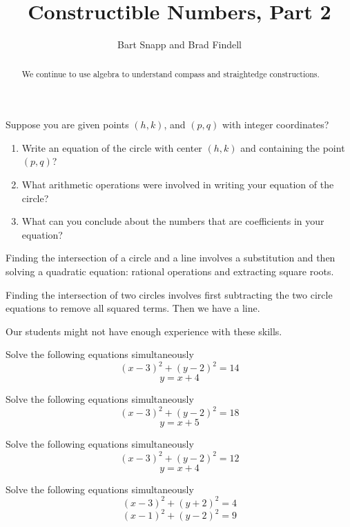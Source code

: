 \documentclass[nooutcomes,handout]{ximera}
\title{Constructible Numbers, Part 2}
\author{Bart Snapp and Brad Findell}
\begin{document}
\begin{abstract}
  We continue to use algebra to understand compass and straightedge
  constructions.
\end{abstract}
\maketitle

\begin{problem}
Suppose you are given points $(h, k)$, and $(p, q)$ with integer coordinates?  
\begin{enumerate}
\item Write an equation of the circle with center $(h, k)$ and containing the point $(p, q)$?  
\item What arithmetic operations were involved in writing your equation of the circle?  
\item What can you conclude about the numbers that are coefficients in your equation?   
\end{enumerate}
\end{problem}

\begin{teachingnote}
Finding the intersection of a circle and a line involves a substitution and then solving a quadratic equation:  rational operations and extracting square roots.  

Finding the intersection of two circles involves first subtracting the two circle equations to remove all squared terms.  Then we have a line.  

Our students might not have enough experience with these skills.  
\end{teachingnote}

\begin{problem}
Solve the following equations simultaneously
$$(x-3)^2+(y-2)^2 = 14$$
$$ y = x + 4$$
\end{problem}

\break

\begin{problem}
Solve the following equations simultaneously
$$(x-3)^2+(y-2)^2 = 18$$
$$ y = x + 5$$
\end{problem}

\begin{problem}
Solve the following equations simultaneously
$$(x-3)^2+(y-2)^2 = 12$$
$$ y = x + 4$$
\end{problem}


\begin{problem}
Solve the following equations simultaneously
$$(x-3)^2+(y+2)^2 = 4$$
$$(x-1)^2+(y-2)^2 = 9$$
\end{problem}
\end{document}
